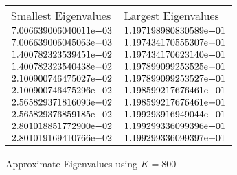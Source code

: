 \begin{enumerate}
\begin{figure} 
 \centering    
\begin{tabular}{ ||p{6cm}||p{6cm}|}
\hline
 Smallest Eigenvalues & Largest Eigenvalues \\ \hhline{|=|=|}    
\hline
${7.006639006040011}\mathrm{e}{-03}$ & ${1.197198980830589}\mathrm{e}{+01}$ \\  
${7.006639006045063}\mathrm{e}{-03}$ & ${1.197434170555307}\mathrm{e}{+01}$ \\  
${1.400782323539451}\mathrm{e}{-02}$ & ${1.197434170623140}\mathrm{e}{+01}$ \\  
${1.400782323540438}\mathrm{e}{-02}$ & ${1.197899099253525}\mathrm{e}{+01}$ \\  
${2.100900746475027}\mathrm{e}{-02}$ & ${1.197899099253527}\mathrm{e}{+01}$ \\  
${2.100900746475296}\mathrm{e}{-02}$ & ${1.198599217676461}\mathrm{e}{+01}$ \\  
${2.565829371816093}\mathrm{e}{-02}$ & ${1.198599217676461}\mathrm{e}{+01}$ \\  
${2.565829376859185}\mathrm{e}{-02}$ & ${1.199293916949044}\mathrm{e}{+01}$ \\  
${2.801018851772900}\mathrm{e}{-02}$ & ${1.199299336099396}\mathrm{e}{+01}$ \\  
${2.801019169410766}\mathrm{e}{-02}$ & ${1.199299336099397}\mathrm{e}{+01}$ \\  
\hline  
\end{tabular} 
\caption{Approximate Eigenvalues using $K = 800$}
   \label{tab:eig800}
\end{figure} 


\end{enumerate}
